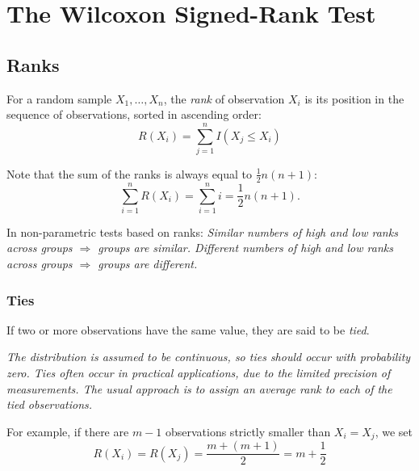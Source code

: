 \chapter{The Wilcoxon Signed-Rank Test}\label{chap:wsr}
\setcounter{page}{1}
\startcontents[chapters]
\chapcontents

\section{Ranks}

\begin{definition}
For a random sample $X_1,\ldots,X_n$, the \emph{rank} of observation $X_i$ is its position in the sequence of observations, sorted in ascending order:
\[
R(X_i) = \sum_{j=1}^n I(X_j \leq X_i)
\]
\end{definition}

Note that the sum of the ranks is always equal to $\frac{1}{2}n(n+1)$:
\[
\displaystyle \sum_{i=1}^n R(X_i) = \sum_{i=1}^n i = \frac{1}{2}n(n+1).
\]

In non-parametric tests based on ranks:
\bit
\it Similar numbers of high and low ranks across groups $\Rightarrow$ groups are similar.
\it Different numbers of high and low ranks across groups $\Rightarrow$ groups are different.
\eit


\subsection{Ties}
If two or more observations have the same value, they are said to be \emph{tied}.

\bit
\it The distribution is assumed to be continuous, so ties should occur with probability zero.
\it Ties often occur in practical applications, due to the limited precision of measurements.
\it The usual approach is to assign an average rank to each of the tied observations.
\eit

For example, if there are $m-1$ observations strictly smaller than $X_i=X_j$, we set
\[
R(X_i) = R(X_j) = \frac{m+(m+1)}{2} = m+\frac{1}{2}
\]


